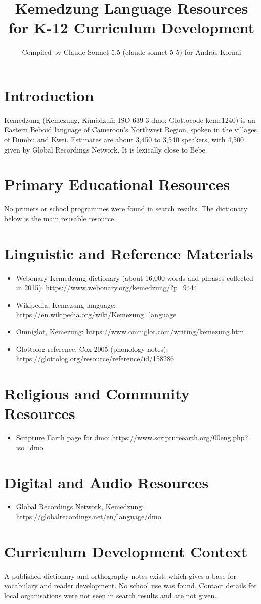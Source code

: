 \documentclass[12pt]{article}
\title{Kemedzung Language Resources for K-12 Curriculum Development}
\author{Compiled by Claude Sonnet 5.5 (claude-sonnet-5-5) for Andr\'as Kornai}
\date{}
\begin{document}
\maketitle

\section{Introduction}
Kemedzung (Kemezung, K\'{\i}m\u{a}dzu\~{n}; ISO 639-3 dmo; Glottocode keme1240) is an Eastern Beboid language of Cameroon's Northwest Region, spoken in the villages of Dumbu and Kwei. Estimates are about 3,450 to 3,540 speakers, with 4,500 given by Global Recordings Network. It is lexically close to Bebe.

\section{Primary Educational Resources}
No primers or school programmes were found in search results. The dictionary below is the main reusable resource.

\section{Linguistic and Reference Materials}
\begin{itemize}
\item Webonary Kemedzung dictionary (about 16,000 words and phrases collected in 2015): \url{https://www.webonary.org/kemedzung/?p=9444}
\item Wikipedia, Kemezung language: \url{https://en.wikipedia.org/wiki/Kemezung_language}
\item Omniglot, Kemezung: \url{https://www.omniglot.com/writing/kemezung.htm}
\item Glottolog reference, Cox 2005 (phonology notes): \url{https://glottolog.org/resource/reference/id/158286}
\end{itemize}

\section{Religious and Community Resources}
\begin{itemize}
\item Scripture Earth page for dmo: \url{https://www.scriptureearth.org/00eng.php?iso=dmo}
\end{itemize}

\section{Digital and Audio Resources}
\begin{itemize}
\item Global Recordings Network, Kemedzung: \url{https://globalrecordings.net/en/language/dmo}
\end{itemize}

\section{Curriculum Development Context}
A published dictionary and orthography notes exist, which gives a base for vocabulary and reader development. No school use was found. Contact details for local organisations were not seen in search results and are not given.
\end{document}

